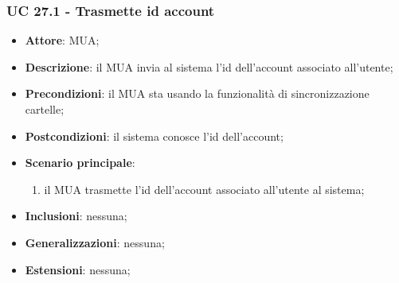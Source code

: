     \subsubsection{UC 27.1 - Trasmette id account} \label{sec:UC27.1}
    \begin{itemize}
        \item \textbf{Attore}: MUA;
        \item \textbf{Descrizione}: il MUA invia al sistema l'id dell'account associato all'utente;
        \item \textbf{Precondizioni}: il MUA sta usando la funzionalità di sincronizzazione cartelle;
        \item \textbf{Postcondizioni}: il sistema conosce l'id dell'account;
        \item \textbf{Scenario principale}:
            \begin{enumerate}
                \item il MUA trasmette l'id dell'account associato all'utente al sistema;
            \end{enumerate}
        \item \textbf{Inclusioni}: nessuna;
        \item \textbf{Generalizzazioni}: nessuna;
        \item \textbf{Estensioni}: nessuna;
    \end{itemize}

